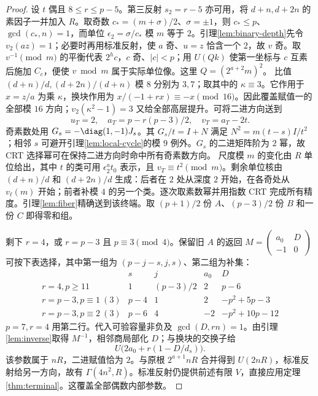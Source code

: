 \begin{proof}
设 $t$ 偶且 $8\le r\le p-5$。第三反射 $s_2=r-5$ 亦可用，将 $d+n,d+2n$ 的素因子一并加入 $R$。取奇数 $c_*=(m+\sigma)/2$、$\sigma=\pm1$，则 $c_*\le p$、$\gcd(c_*,n)=1$，而单位 $\epsilon_2=\sigma/c_*$ 模 $m$ 等于 $2$。引理\ref{lem:binary-depth}先令 $v_2(az)=1$；必要时再用标准反射，使 $a$ 奇、$u=z$ 恰含一个 $2$，故 $v$ 奇。取 $v^{-1}\pmod m$ 的平衡代表 $2^h c$，$c$ 奇、$|c|<p$；用 $U(Qk)$ 使第一坐标与 $c$ 互素后施加 $C_c$，便使 $v\bmod m$ 属于实际单位像。这里 $Q=(2^{a+2}m)^2$。
比值 $(d+n)/d,(d+2n)/(d+n)$ 模 $8$ 分别为 $3,7$；取其中的 $\kappa\equiv3$。它作用于 $x=z/a$ 为乘 $\kappa$，换块作用为 $x/(-1+rx)\equiv-x\pmod{16}$。因此覆盖赋值一的全部模 $16$ 方向；$v_2(\kappa^2-1)=3$ 又给全部高层提升。可将二进方向送到
\[
u_T=2,\quad a_T=p-r(p-3)/2,\quad v_T=a_T-2t.
\]
奇素数处用 $G_s=-\diag(1,-1)J_s$。其 $G_s/t=I+N$ 满足 $N^2=m(t-s)I/t^2$；相邻 $s$ 可避开引理\ref{lem:local-cycle}的模 $9$ 例外。$G_s$ 的二进矩阵阶为 $2$ 幂，故 CRT 选择幂可在保持二进方向时命中所有奇素数方向。
尺度模 $m$ 的变化由 $R$ 单位给出，其中 $t$ 的类可用 $\epsilon_2^a t_0$ 表示，且 $v_T\equiv t^2\pmod m$。剩余单位核由 $(d+n)/d$ 和 $(d+2n)/d$ 生成：后者在 $2$ 处从深度 $2$ 开始，在各奇处从 $v_\ell(m)$ 开始；前者补模 $4$ 的另一个类。逐次取素数幂并用指数 CRT 完成所有精度。引理\ref{lem:fiber}精确送到该终端。取 $(p+1)/2$ 份 $A$、$(p-3)/2$ 份 $B$ 和一份 $C$ 即得零和组。

剩下 $r=4$，或 $r=p-3$ 且 $p\equiv3\pmod4$。保留旧 $A$ 的返回 $M=\left(\begin{smallmatrix}a_0&D\\-1&0\end{smallmatrix}\right)$ 可按下表选择，其中第一组为 $(p-j-s,j,s)$、第二组为补集：
\[
\begin{array}{c|rrrr}
&s&j&a_0&D\\\hline
r=4,p\ge11&1&(p-3)/2&2&p-6\\
r=p-3,p\equiv1\ (3)&p-4&1&2&-p^2+5p-3\\
r=p-3,p\equiv2\ (3)&p-6&4&-2&-p^2+10p-12
\end{array}
\]
$p=7,r=4$ 用第二行。代入可验容量非负及 $\gcd(D,rn)=1$。由引理\ref{lem:inverse}取得 $M^{-1}$，相邻商局部化 $D$；与换块的交换子给
\[U\bigl(2a_0+r(1-D/d_s)\bigr).
\]
该参数属于 $nR$，二进赋值恰为 $2$。与原根 $2^{a+1}nR$ 合并得到 $U(2nR)$，标准反射给另一方向，故有 $\Gamma(4n^2,R)$。标准反射仍提供前述有限 $V$，直接应用定理\ref{thm:terminal}。这覆盖全部偶数内部参数。
\end{proof}

